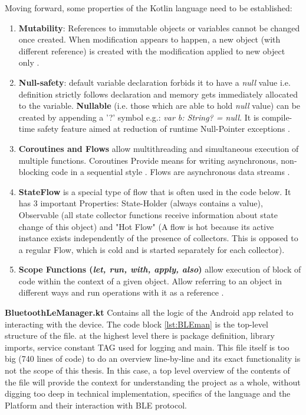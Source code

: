 Moving forward, some properties of the Kotlin language need to be established:
\begin{enumerate}
	\item \textbf{Mutability}: References to immutable objects or variables cannot be changed once created. When modification appears to happen, a new object (with different reference) is created with the modification applied to new object only \cite{kotlin_variables} \cite{kotlin_collections}.
	\item \textbf{Null-safety}: default variable declaration forbids it to have a \textit{null} value i.e. definition strictly follows declaration and memory gets immediately allocated to the variable. \textbf{Nullable} (i.e. those which are able to hold \textit{null} value) can be created by appending a '?' symbol e.g.: \textit{var b: String? = null}. It is  compile-time safety feature aimed at reduction of runtime Null-Pointer exceptions \cite{kotlin_null_safety}.
	\item \textbf{Coroutines and Flows} allow multithreading and simultaneous execution of multiple functions. Coroutines Provide means for writing asynchronous, non-blocking code in a sequential style \cite{kotlin_coroutines}. Flows are asynchronous data streams \cite{kotlin_flow}. 
	\item \textbf{StateFlow} is a special type of flow that is often used in the code below. It has 3 important Properties: State-Holder (always contains a value), Observable (all state collector functions receive information about state change of this object) and "Hot Flow" (A flow is hot because its active instance exists independently of the presence of collectors. This is opposed to a regular Flow, which is cold and is started separately for each collector)\cite{jetbrains_stateflow}.
	\item \textbf{Scope Functions (\textit{let, run, with, apply, also})} allow execution of block of code within the context of a given object. Allow referring to an object in different ways and run operations with it as a reference \cite{kotlin_scope_functions}.
\end{enumerate}

\textbf{BluetoothLeManager.kt} Contains all the logic of the Android app related to interacting with the device. The code block \ref{lst:BLEman} is the top-level structure of the file. at the highest level there is package definition, library imports, service constant TAG used for logging and main. This file itself is too big (740 lines of code) to do an overview line-by-line and its exact functionality is not the scope of this thesis. In this case, a top level overview of the contents of the file will provide the context for understanding the project as a whole, without digging too deep in technical implementation, specifics of the language and the Platform and their interaction with \ac{BLE} protocol.

